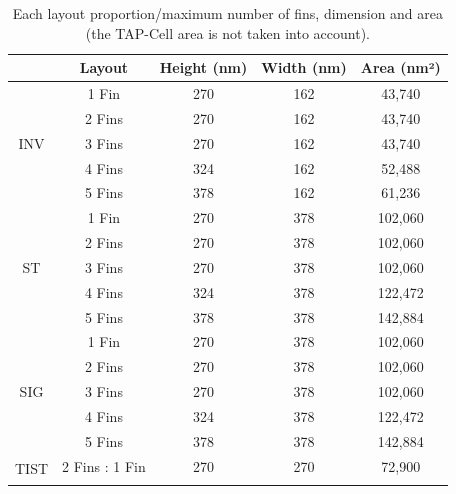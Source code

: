\documentclass[pgmicro,mestrado,english]{iiufrgs}
\begin{document}
\begin{table}[]
\centering
\caption{Each layout proportion/maximum number of fins, dimension and area (the TAP-Cell area is not taken into account).}
\label{tab:areas}
\begin{tabular}{|c|c|c|c|c|}
\hline
                      & Layout & Height (nm) & Width (nm) & Area (nm²) \\ \hline
\multirow{5}{*}{INV}  & 1 Fin             & 270         & 162        & 43,740‬    \\ \cline{2-5} 
                      & 2 Fins             & 270         & 162        & 43,740‬    \\ \cline{2-5} 
                      & 3 Fins             & 270         & 162        & 43,740‬    \\ \cline{2-5} 
                      & 4 Fins             & 324         & 162        & 52,488     \\ \cline{2-5} 
                      & 5 Fins             & 378         & 162        & 61,236     \\ \hline
\multirow{5}{*}{ST}   & 1 Fin             & 270         & 378        & 102,060    \\ \cline{2-5} 
                      & 2 Fins             & 270         & 378        & 102,060    \\ \cline{2-5} 
                      & 3 Fins             & 270         & 378        & 102,060    \\ \cline{2-5} 
                      & 4 Fins             & 324         & 378        & 122,472    \\ \cline{2-5} 
                      & 5 Fins             & 378         & 378        & 142,884    \\ \hline
\multirow{5}{*}{SIG}  & 1 Fin             & 270         & 378        & 102,060    \\ \cline{2-5} 
                      & 2 Fins             & 270         & 378        & 102,060    \\ \cline{2-5} 
                      & 3 Fins             & 270         & 378        & 102,060    \\ \cline{2-5} 
                      & 4 Fins             & 324         & 378        & 122,472    \\ \cline{2-5} 
                      & 5 Fins             & 378         & 378        & 142,884    \\ \hline
\multirow{5}{*}{TIST} & 2 Fins : 1 Fin             & 270         & 270        & 72,900     \\ \cline{2-5} 

\end{tabular}
\end{table}
\end{document}
